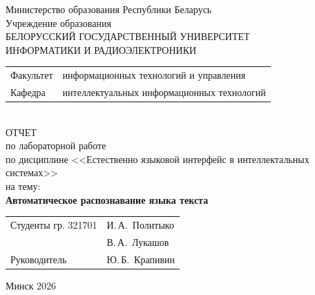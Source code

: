 \begin{titlepage}
	\begin{center}
		Министерство образования Республики Беларусь\\[1em]
		Учреждение образования\\
		БЕЛОРУССКИЙ ГОСУДАРСТВЕННЫЙ УНИВЕРСИТЕТ \\
		ИНФОРМАТИКИ И РАДИОЭЛЕКТРОНИКИ\\[1em]

		\begin{minipage}{\textwidth}
			\begin{flushleft}
				\begin{tabular}{ l l }
					Факультет & информационных технологий и управления     \\
					Кафедра   & интеллектуальных информационных технологий
				\end{tabular}
			\end{flushleft}
		\end{minipage}\\[1em]

		{ОТЧЕТ}\\
		{по лабораторной работе}\\
		{по дисциплине <<Естественно языковой интерфейс в интеллектальных системах>>}\\
		{на тему:}\\[1em]
		\textbf{\large Автоматическое распознавание языка текста}\\[1em]

		\vspace{2em}
		\begin{tabular}{ p{}p{} }
			Студенты гр. 321701 & И.\,А.~Политыко \\
			                    & В.\,А.~Лукашов  \\
			Руководитель        & Ю.\,Б.~Крапивин \\
		\end{tabular}

		\vfill
		{\normalsize Минск 2026}
	\end{center}
\end{titlepage}
